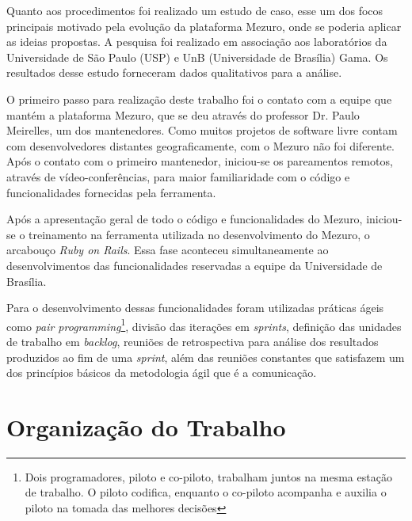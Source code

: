 Quanto aos procedimentos foi realizado um estudo de caso, esse um dos focos principais motivado pela evolução da plataforma Mezuro, onde se poderia aplicar as ideias propostas. A pesquisa foi realizado em associação aos laboratórios da Universidade de São Paulo (USP) e UnB (Universidade de Brasília) Gama. Os resultados desse estudo forneceram dados qualitativos para a análise.

O primeiro passo para realização deste trabalho foi o contato com a equipe que mantém a plataforma Mezuro, que se deu através do professor Dr. Paulo Meirelles, um dos mantenedores. Como muitos projetos de software livre contam com desenvolvedores distantes geograficamente, com o Mezuro não foi diferente. Após o contato com o primeiro mantenedor, iniciou-se os pareamentos remotos, através de vídeo-conferências, para maior familiaridade com o código e funcionalidades fornecidas pela ferramenta.

Após a apresentação geral de todo o código e funcionalidades do Mezuro, iniciou-se o treinamento na ferramenta utilizada no desenvolvimento do Mezuro, o arcabouço \textit{Ruby on Rails}. Essa fase aconteceu simultaneamente ao desenvolvimentos das funcionalidades reservadas a equipe da Universidade de Brasília.

Para o desenvolvimento dessas funcionalidades foram utilizadas práticas ágeis como \textit{pair programming}\footnote{Dois programadores, piloto e co-piloto, trabalham juntos na mesma estação de trabalho. O piloto codifica, enquanto o co-piloto acompanha e auxilia o piloto na tomada das melhores decisões}, divisão das iterações em \textit{sprints}, definição das unidades de trabalho em \textit{backlog}, reuniões de retrospectiva para análise dos resultados produzidos ao fim de uma \textit{sprint}, além das reuniões constantes que satisfazem um dos princípios básicos da metodologia ágil que é a comunicação.

\section{Organização do Trabalho}

